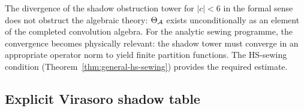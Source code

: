\begin{remark}
\label{rem:convergence-sewing}
The divergence of the shadow obstruction tower for $|c| < 6$ in
the formal sense does not obstruct the algebraic theory:
$\Theta_{\mathcal{A}}$ exists unconditionally as an element of
the completed convolution algebra. For
the analytic sewing programme, the
convergence becomes physically relevant: the shadow
tower must converge in an appropriate operator norm to
yield finite partition functions. The HS-sewing
condition (Theorem~\ref{thm:general-hs-sewing}) provides
the required estimate.
\end{remark}


\subsection{Explicit Virasoro shadow table}
\label{subsec:virasoro-shadow-table}


